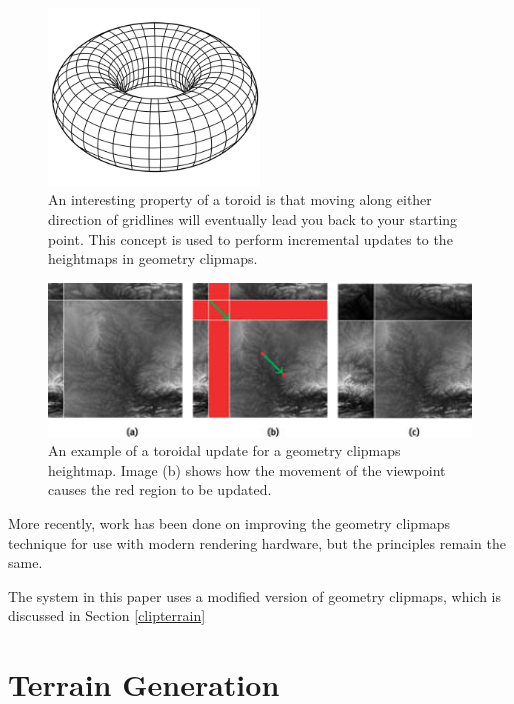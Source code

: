\begin{figure}
	\centering
		\includegraphics[width=0.5\textwidth]{figures/toroid.png}
	\caption{
		An interesting property of a toroid is that moving along either direction of gridlines will eventually lead you back to your starting point.
		This concept is used to perform incremental updates to the heightmaps in geometry clipmaps.
	}
	\label{fig:toroid}
\end{figure}

\begin{figure}
	\centering
		\includegraphics[width=1.0\textwidth]{figures/clipmaps_update.jpg}
	\caption{
		An example of a toroidal update for a geometry clipmaps heightmap.
		Image (b) shows how the movement of the viewpoint causes the red region to be updated.
	}
	\label{fig:clipmaps_update}
\end{figure}

More recently, work has been done on improving the geometry clipmaps technique for use with modern rendering hardware, but the principles remain the same. \cite{gems_clipmaps}

The system in this paper uses a modified version of geometry clipmaps, which is discussed in Section \ref{clipterrain}

\section{Terrain Generation} \label{terrain_gen}

